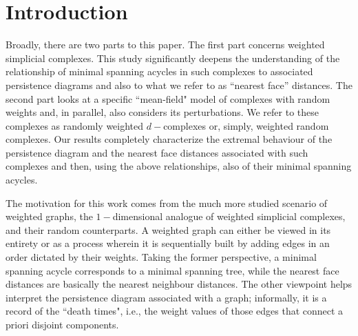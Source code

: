 \documentclass[12pt]{amsart}
\newcommand{\dy}[1]{\textcolor{magenta}{#1}}
\renewcommand{\dy}[1]{#1}
\numberwithin{equation}{section}
\numberwithin{theorem}{section}
\newcommand{\1}{\mathbf{1}}
\begin{document}
\section{Introduction}
%
Broadly, there are two parts to this paper. The first part concerns weighted simplicial complexes. This study significantly deepens the understanding of the relationship of minimal spanning acycles in such complexes to associated persistence diagrams and also to what we refer to as ``nearest face'' distances. The second part looks at a specific ``mean-field" model of complexes with random weights and, in parallel, also considers its perturbations. We refer to these complexes as randomly weighted $d-$complexes or, simply, weighted random complexes. Our results  completely characterize the extremal behaviour of the persistence diagram and the nearest face distances associated with such complexes and then, using the above relationships, also of their minimal spanning acycles.

The motivation for this work comes from the much more studied scenario of weighted graphs, the $1-$dimensional analogue of weighted simplicial complexes, and their random counterparts. A weighted graph can either be viewed in its entirety or as a process wherein it is sequentially built by adding edges in an order dictated by their weights. Taking the former perspective, a minimal spanning acycle corresponds to a minimal spanning tree, while the nearest face distances are basically the nearest neighbour distances. The other viewpoint helps interpret the persistence diagram associated with a graph; informally, it is a record of the ``death times", i.e., the weight values of those edges that connect \dy{a priori disjoint} components.
\end{document}
